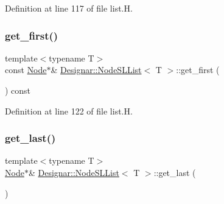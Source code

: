 Definition at line 117 of file list.\+H.

\mbox{\label{class_designar_1_1_node_s_l_list_a1644a837ab4aac745c809b021fc21dfc}} 
\subsubsection{\texorpdfstring{get\+\_\+first()}{get\_first()}\hspace{0.1cm}{\footnotesize\ttfamily [2/2]}}
{\footnotesize\ttfamily template$<$typename T$>$ \\
const \hyperlink{class_designar_1_1_node_s_l_list_a41963019ada1025099e3259207a3de96}{Node}$\ast$\& \hyperlink{class_designar_1_1_node_s_l_list}{Designar\+::\+Node\+S\+L\+List}$<$ T $>$\+::get\+\_\+first (\begin{DoxyParamCaption}{ }\end{DoxyParamCaption}) const\hspace{0.3cm}{\ttfamily [inline]}}



Definition at line 122 of file list.\+H.

\mbox{\label{class_designar_1_1_node_s_l_list_a1c42a40b92315cd21a81c1ae74b65636}} 
\subsubsection{\texorpdfstring{get\+\_\+last()}{get\_last()}\hspace{0.1cm}{\footnotesize\ttfamily [1/2]}}
{\footnotesize\ttfamily template$<$typename T$>$ \\
\hyperlink{class_designar_1_1_node_s_l_list_a41963019ada1025099e3259207a3de96}{Node}$\ast$\& \hyperlink{class_designar_1_1_node_s_l_list}{Designar\+::\+Node\+S\+L\+List}$<$ T $>$\+::get\+\_\+last (\begin{DoxyParamCaption}{ }\end{DoxyParamCaption})\hspace{0.3cm}{\ttfamily [inline]}}




